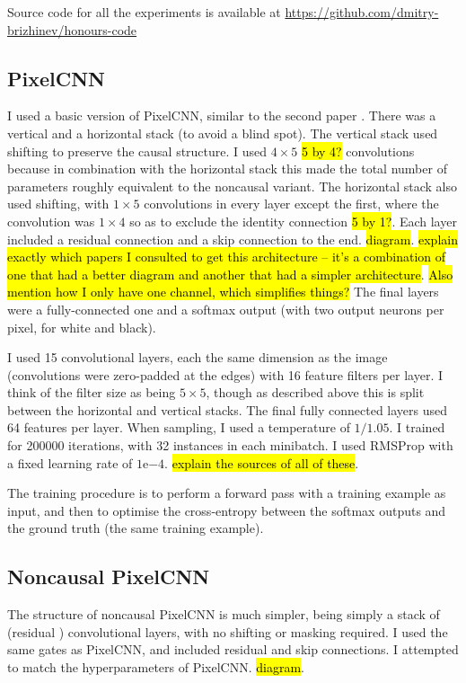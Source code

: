 \documentclass[10pt,a4paper]{article}
\begin{document}
Source code for all the experiments is available at \url{https://github.com/dmitry-brizhinev/honours-code}

\subsection{PixelCNN}

I used a basic version of PixelCNN, similar to the second paper \cite{??}. There was a vertical and a horizontal stack (to avoid a blind spot). The vertical stack used shifting to preserve the causal structure. I used $4\times 5$ \hl{5 by 4?} convolutions because in combination with the horizontal stack this made the total number of parameters roughly equivalent to the noncausal variant. The horizontal stack also used shifting, with $1\times 5$ convolutions in every layer except the first, where the convolution was $1\times 4$ so as to exclude the identity connection \hl{5 by 1?}. Each layer included a residual connection and a skip connection to the end. \hl{diagram}. \hl{explain exactly which papers I consulted to get this architecture -- it's a combination of one that had a better diagram and another that had a simpler architecture}. \hl{Also mention how I only have one channel, which simplifies things?} The final layers were a fully-connected one and a softmax output (with two output neurons per pixel, for white and black).

I used 15 convolutional layers, each the same dimension as the image (convolutions were zero-padded at the edges) with 16 feature filters per layer. I think of the filter size as being $5\times 5$, though as described above this is split between the horizontal and vertical stacks. The final fully connected layers used 64 features per layer. When sampling, I used a temperature of $1/1.05$. I trained for 200000 iterations, with 32 instances in each minibatch. I used RMSProp with a fixed learning rate of $1\mathrm{e}{-4}$. \hl{explain the sources of all of these}.

The training procedure is to perform a forward pass with a training example as input, and then to optimise the cross-entropy between the softmax outputs and the ground truth (the same training example).

\subsection{Noncausal PixelCNN}

The structure of noncausal PixelCNN is much simpler, being simply a stack of (residual \cite{??}) convolutional layers, with no shifting or masking required. I used the same gates as PixelCNN, and included residual and skip connections. I attempted to match the hyperparameters of PixelCNN. \hl{diagram}.
\end{document}
